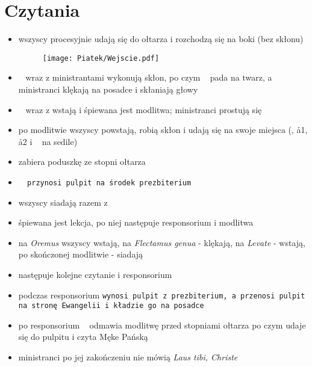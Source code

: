\section{Czytania}

\begin{itemize}
    \item wszyscy procesyjnie udają się do ołtarza i rozchodzą się na boki (bez
    skłonu)

          \begin{figure}[h]
              \centering
              \texttt{[image: Piatek/Wejscie.pdf]}
          \end{figure}

    \item \ii~ wraz z ministrantami wykonują skłon, po czym \ii~ pada na twarz,
    a ministranci klękają na posadce i skłaniają głowy
    \item \ii~ wraz z  wstają i śpiewana jest modlitwa; ministranci prostują
    się
    \item po modlitwie wszyscy powstają, robią skłon i udają się na swoje
    miejsca (\ii, \aa1, \aa2 i \cc~ na sedile)
    \item {} zabiera poduszkę ze stopni ołtarza
    \item \tt~ przynosi pulpit na środek prezbiterium
    \item wszyscy siadają razem z \ii
    \item śpiewana jest lekcja, po niej następuje responsorium i modlitwa
    \item na \textit{Oremus} wszyscy wstają, na \textit{Flectamus genua} -
    klękają, na \textit{Levate} - wstają, po skończonej modlitwie - siadają
    \item następuje kolejne czytanie i responsorium
    \item podczas responsorium \tt wynosi pulpit z prezbiterium, a  przenosi
    pulpit na stronę Ewangelii i kładzie go na posadce
    \item po responsorium \ii~ odmawia modlitwę przed stopniami ołtarza po czym
    udaje się do pulpitu i czyta Męke Pańską
    \item ministranci po jej zakończeniu nie mówią \textit{Laus tibi, Christe}
\end{itemize}